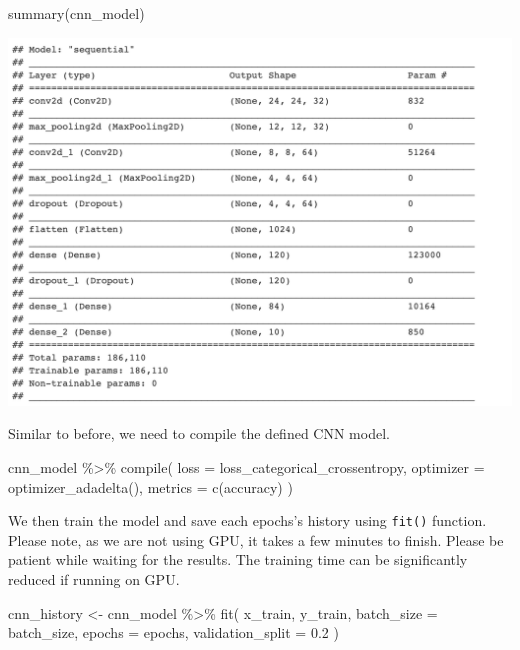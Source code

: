 \documentclass[
  12pt,
]{krantz}
\makeatletter
\newenvironment{Shaded}{\begin{snugshade}}{\end{snugshade}}
\newcommand{\AttributeTok}[1]{\textcolor[rgb]{0.61,0.61,0.61}{#1}}
\newcommand{\FloatTok}[1]{\textcolor[rgb]{0.06,0.06,0.06}{#1}}
\newcommand{\FunctionTok}[1]{\textcolor[rgb]{0,0,0}{#1}}
\newcommand{\NormalTok}[1]{#1}
\newcommand{\OtherTok}[1]{\textcolor[rgb]{0.37,0.37,0.37}{#1}}
\newcommand{\SpecialCharTok}[1]{\textcolor[rgb]{0,0,0}{#1}}
\newcommand{\StringTok}[1]{\textcolor[rgb]{0.5,0.5,0.5}{#1}}
\newenvironment{kframe}{%
\medskip{}
\setlength{\fboxsep}{.8em}
 \def\at@end@of@kframe{}%
 \ifinner\ifhmode%
  \def\at@end@of@kframe{\end{minipage}}%
  \begin{minipage}{\columnwidth}%
 \fi\fi%
 \def\FrameCommand##1{\hskip\@totalleftmargin \hskip-\fboxsep
 \colorbox{shadecolor}{##1}\hskip-\fboxsep
     \hskip-\linewidth \hskip-\@totalleftmargin \hskip\columnwidth}%
 \MakeFramed {\advance\hsize-\width
   \@totalleftmargin\z@ \linewidth\hsize
   \@setminipage}}%
 {\par\unskip\endMakeFramed%
 \at@end@of@kframe}
\renewenvironment{Shaded}{\begin{kframe}}{\end{kframe}}
\makeatother
\begin{document}
\begin{Shaded}
\begin{Highlighting}[]
\FunctionTok{summary}\NormalTok{(cnn\_model)}
\end{Highlighting}
\end{Shaded}

\includegraphics[width=1\textwidth,height=\textheight]{images/cnn_summary.png}

Similar to before, we need to compile the defined CNN model.

\begin{Shaded}
\begin{Highlighting}[]
\NormalTok{cnn\_model }\SpecialCharTok{\%\textgreater{}\%} \FunctionTok{compile}\NormalTok{(}
  \AttributeTok{loss =}\NormalTok{ loss\_categorical\_crossentropy,}
  \AttributeTok{optimizer =} \FunctionTok{optimizer\_adadelta}\NormalTok{(),}
  \AttributeTok{metrics =} \FunctionTok{c}\NormalTok{(}\StringTok{\textquotesingle{}accuracy\textquotesingle{}}\NormalTok{)}
\NormalTok{)}
\end{Highlighting}
\end{Shaded}

We then train the model and save each epochs's history using \texttt{fit()} function. Please note, as we are not using GPU, it takes a few minutes to finish. Please be patient while waiting for the results. The training time can be significantly reduced if running on GPU.

\begin{Shaded}
\begin{Highlighting}[]
\NormalTok{cnn\_history }\OtherTok{\textless{}{-}}\NormalTok{ cnn\_model }\SpecialCharTok{\%\textgreater{}\%} \FunctionTok{fit}\NormalTok{(}
\NormalTok{  x\_train, y\_train,}
  \AttributeTok{batch\_size =}\NormalTok{ batch\_size,}
  \AttributeTok{epochs =}\NormalTok{ epochs,}
  \AttributeTok{validation\_split =} \FloatTok{0.2}
\NormalTok{)}
\end{Highlighting}
\end{Shaded}
\end{document}
